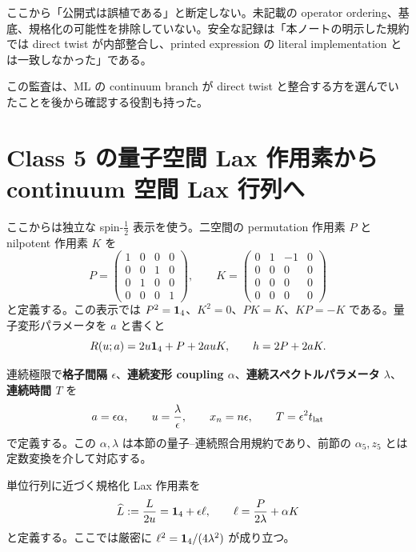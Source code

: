 \begin{cautionnote}
ここから「公開式は誤植である」と断定しない。未記載の operator ordering、基底、規格化の可能性を排除していない。安全な記録は「本ノートの明示した規約では direct twist が内部整合し、printed expression の literal implementation とは一致しなかった」である。
\end{cautionnote}

この監査は、ML の continuum branch が direct twist と整合する方を選んでいたことを後から確認する役割も持った。

\section{Class 5 の量子空間 Lax 作用素から continuum 空間 Lax 行列へ}
ここからは独立な spin-$\tfrac12$ 表示を使う。二空間の permutation 作用素 $P$ と nilpotent 作用素 $K$ を
\begin{equation}
P=\begin{pmatrix}1&0&0&0\\0&0&1&0\\0&1&0&0\\0&0&0&1\end{pmatrix},\qquad
K=\begin{pmatrix}0&1&-1&0\\0&0&0&0\\0&0&0&0\\0&0&0&0\end{pmatrix}
\label{eq:C5PK}
\end{equation}
と定義する。この表示では $P^2=\mathbf 1_{4}$、$K^2=0$、$PK=K$、$KP=-K$ である。量子変形パラメータを $a$ と書くと
\begin{equation}
R(u;a)=2u\mathbf 1_{4}+P+2auK,
\qquad
h=2P+2aK.
\label{eq:C5Rind}
\end{equation}

連続極限で\textbf{格子間隔 $\epsilon$}、\textbf{連続変形 coupling $\alpha$}、\textbf{連続スペクトルパラメータ $\lambda$}、\textbf{連続時間 $T$} を
\begin{equation}
a=\epsilon\alpha,\qquad u=\frac{\lambda}{\epsilon},\qquad x_n=n\epsilon,
\qquad T=\epsilon^2t_{\rm lat}
\label{eq:C5scaling}
\end{equation}
で定義する。この $\alpha,\lambda$ は本節の量子--連続照合用規約であり、前節の $\alpha_5,z_5$ とは定数変換を介して対応する。

単位行列に近づく規格化 Lax 作用素を
\begin{equation}
\widehat L:=\frac{L}{2u}=\mathbf 1_{4}+\epsilon\ell,
\qquad
\ell=\frac{P}{2\lambda}+\alpha K
\label{eq:C5Lhat}
\end{equation}
と定義する。ここでは厳密に $\ell^2=\mathbf 1_{4}/(4\lambda^2)$ が成り立つ。

